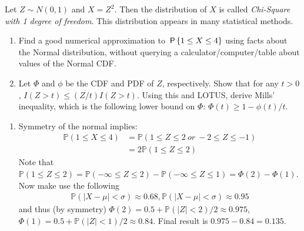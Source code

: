 

\setcounter{theorem}{31}
\begin{exercise}[BH.5.32] Let $Z \sim N(0, 1)$ and $X = Z^2$. Then the distribution of $X$ is called \emph{Chi-Square with 1 degree of freedom}. This distribution appears in many statistical methods.
	\begin{enumerate}
		\item Find a good numerical approximation to $\P{1 \leq X \leq 4}$ using facts about the Normal distribution, without querying a calculator/computer/table about values of the Normal CDF.
		\item Let $\Phi$ and $\phi$ be the CDF and PDF of $Z$, respectively. Show that for any $t > 0$, $I(Z > t) \leq (Z/t) I(Z > t)$. Using this and LOTUS, derive Mills' inequality, which is the following lower bound on $\Phi$: $\Phi(t) \geq 1 - \phi(t) / t$.
	\end{enumerate}
\begin{solution}
    \begin{enumerate}
	    \item Symmetry of the normal implies:
    	\begin{align*}
    		\mathbb{P}\left(1\leq X\leq 4 \right) &= \mathbb{P}\left(1\leq Z\leq 2~\textit{or}~ -2\leq Z\leq -1 \right) \\ 
    		& = 2\mathbb{P}\left(1\leq Z\leq 2\right)
    	\end{align*}
    	Note that $\mathbb{P}\left(1\leq Z\leq 2\right) = \mathbb{P}\left(-\infty\leq Z\leq 2\right) - \mathbb{P}\left(-\infty\leq Z\leq 1\right)=\Phi(2)-\Phi(1)$. Now make use the following 
    	\begin{align*}
    		\mathbb{P}\left(|X-\mu|<\sigma \right) \approx 0.68, 	\mathbb{P}\left(|X-\mu|<\sigma \right) \approx 0.95
    	\end{align*}
    	and thus (by symmetry) $\Phi(2) = 0.5 + \mathbb{P}\left(|Z|<2\right)/2 \approx 0.975$,
    	$\Phi(1) = 0.5 + \mathbb{P}\left(|Z|<1\right)/2 \approx 0.84$. Final result is $0.975-0.84=0.135$.\\
    	

\end{enumerate}
\end{solution}
\end{exercise}
